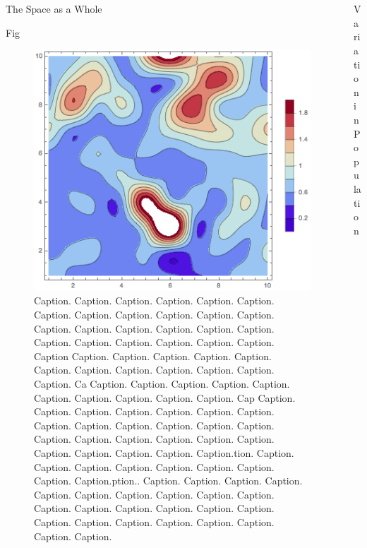 \documentclass[14pt]{beamer}
\renewcommand{\maketitle}{%
	\begin{center}%
		\Huge\inserttitle\\[5mm]%
		\Large\insertauthor\\[5mm]%
		\Large\insertinstitute%
	\end{center}%
	\vspace*{-1.5ex}%
}
\begin{document}
\begin{frame}{\maketitle}
\begin{columns}
\begin{column}{.45\textwidth}
\begin{block}{The Space as a Whole}
\end{block}
\vspace{1em}
\begin{exampleblock}{Fig}
	\begin{figure}[htpb]
		\centering
			\includegraphics[scale=1.3]{thing.png}
		\centering
		\caption{ Caption. Caption. Caption. Caption. Caption. Caption. Caption. Caption. Caption. Caption. Caption. Caption. Caption. Caption. Caption. Caption. Caption. Caption. Caption. Caption. Caption. Caption. Caption. Caption. Caption Caption. Caption. Caption. Caption. Caption. Caption. Caption. Caption. Caption. Caption. Caption. Caption. Ca Caption. Caption. Caption. Caption. Caption. Caption. Caption. Caption. Caption. Caption. Cap Caption. Caption. Caption. Caption. Caption. Caption. Caption. Caption. Caption. Caption. Caption. Caption. Caption. Caption. Caption. Caption. Caption. Caption. Caption. Caption. Caption. Caption. Caption. Caption.tion. Caption. Caption. Caption. Caption. Caption. Caption. Caption. Caption. Caption.ption.. Caption. Caption. Caption. Caption. Caption. Caption. Caption. Caption. Caption. Caption. Caption. Caption. Caption. Caption. Caption. Caption. Caption. Caption. Caption. Caption. Caption. Caption. Caption. Caption.}
		\label{fig:thing_plot}
	\end{figure}
\end{exampleblock}


\end{column}
							
			\begin{column}{.45\textwidth}
			\begin{block}{Variation in Population}


\end{block}
\end{column}
\end{columns}
\end{frame}
\end{document}
